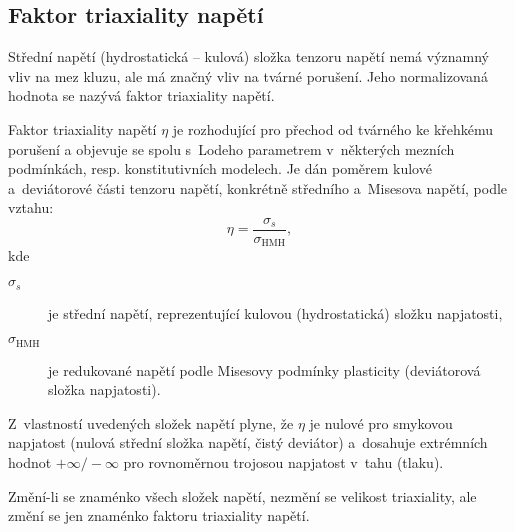 
\subsection{Faktor triaxiality napětí}
Střední napětí (hydrostatická -- kulová) složka tenzoru napětí nemá významný vliv na mez kluzu, ale má značný vliv na tvárné porušení. Jeho normalizovaná hodnota se nazývá faktor triaxiality napětí.

Faktor triaxiality napětí $\eta$ je rozhodující pro přechod od tvárného ke křehkému porušení a objevuje se spolu s~Lodeho parametrem v~některých mezních podmínkách, resp. konstitutivních modelech. Je dán poměrem kulové a~deviátorové části tenzoru napětí, konkrétně středního a~Misesova napětí, podle vztahu:
\begin{equation}
	\eta = \frac{\sigma_s}{\sigma_\text{HMH}},
\end{equation}
kde
\begin{description}
	\item[$\sigma_s$] je střední napětí, reprezentující kulovou (hydrostatická) složku napjatosti,
	\item[$\sigma_\text{HMH}$] je redukované napětí podle Misesovy podmínky plasticity (deviátorová složka napjatosti).
\end{description}

Z~vlastností uvedených složek napětí plyne, že $\eta$ je nulové pro smykovou napjatost (nulová střední složka napětí, čistý deviátor) a~dosahuje extrémních hodnot $+\infty/-\infty$ pro rovnoměrnou trojosou napjatost v~tahu (tlaku). 

Změní-li se znaménko všech složek napětí, nezmění se velikost triaxiality, ale změní se jen znaménko faktoru triaxiality napětí.

